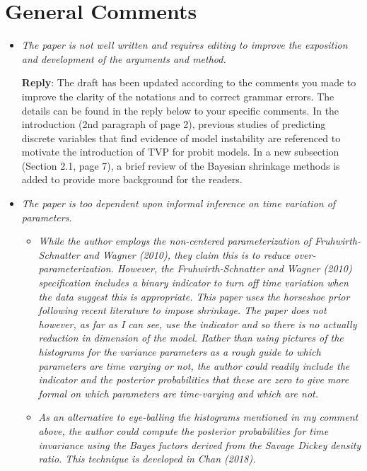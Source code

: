 \documentclass[12pt]{article}
\begin{document}
\section*{General Comments}
\begin{itemize}
\item \textit{The paper is not well written and requires editing to improve the exposition and development of the arguments and method.}

\textbf{Reply}: The draft has been updated according to the comments you made to improve the clarity of the notations and to correct grammar errors. The details can be found in the reply below to your specific comments. In the introduction (2nd paragraph of page 2), previous studies of predicting discrete variables that find evidence of model instability are referenced to motivate the introduction of TVP for probit models. In a new subsection (Section 2.1, page 7), a brief review of the Bayesian shrinkage methods is added to provide more background for the readers.   

\item \textit{The paper is too dependent upon informal inference on time variation of parameters.}
\begin{itemize}
\item \textit{While the author employs the non-centered parameterization of Fruhwirth-Schnatter and Wagner (2010), they claim this is to reduce over-parameterization. However, the Fruhwirth-Schnatter and Wagner (2010) specification includes a binary indicator to turn off time variation when the data suggest this is appropriate. This paper uses the horseshoe prior following recent literature to impose shrinkage. The paper does not however, as far as I can see, use the indicator and so there is no actually reduction in dimension of the model. Rather than using pictures of the histograms for the variance parameters as a rough guide to which parameters are time varying or not, the author could readily include the indicator and the posterior probabilities that these are zero to give more formal on which parameters are time-varying and which are not.}
\item \textit{As an alternative to eye-balling the histograms mentioned in my comment above, the author could compute the posterior probabilities for time invariance using the Bayes factors derived from the Savage Dickey density ratio. This technique is developed in Chan (2018).}
\end{itemize}


\end{itemize}
\end{document}
